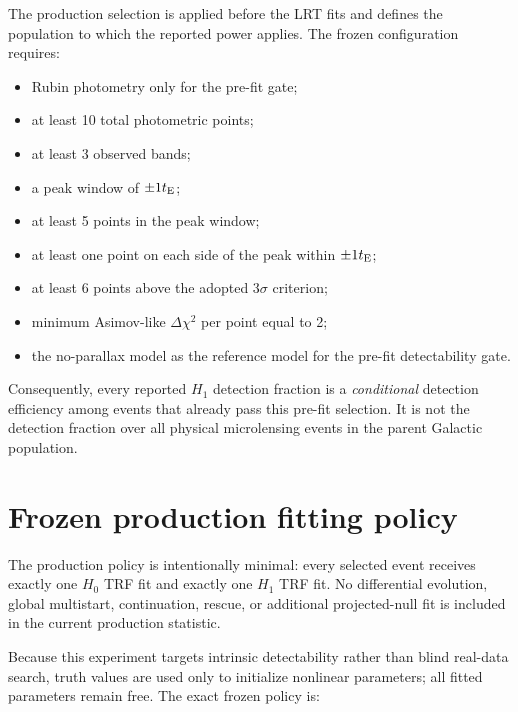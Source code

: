 \documentclass[11pt,a4paper]{article}
\newcommand{\te}{t_{\rm E}}
\newcommand{\Hnull}{H_0}
\newcommand{\Halt}{H_1}
\begin{document}
The production selection is applied before the LRT fits and defines the population to which
the reported power applies. The frozen configuration requires:
\begin{itemize}[leftmargin=2em]
    \item Rubin photometry only for the pre-fit gate;
    \item at least 10 total photometric points;
    \item at least 3 observed bands;
    \item a peak window of $\pm 1\te$;
    \item at least 5 points in the peak window;
    \item at least one point on each side of the peak within $\pm 1\te$;
    \item at least 6 points above the adopted $3\sigma$ criterion;
    \item minimum Asimov-like $\Delta\chi^2$ per point equal to 2;
    \item the no-parallax model as the reference model for the pre-fit detectability gate.
\end{itemize}

Consequently, every reported $\Halt$ detection fraction is a \emph{conditional} detection
efficiency among events that already pass this pre-fit selection. It is not the detection
fraction over all physical microlensing events in the parent Galactic population.

\section{Frozen production fitting policy}
\label{sec:policy}

The production policy is intentionally minimal: every selected event receives exactly one
$\Hnull$ TRF fit and exactly one $\Halt$ TRF fit.  No differential evolution, global
multistart, continuation, rescue, or additional projected-null fit is included in the current
production statistic.

Because this experiment targets intrinsic detectability rather than blind real-data search,
truth values are used only to initialize nonlinear parameters; all fitted parameters remain
free.  The exact frozen policy is:
\end{document}
